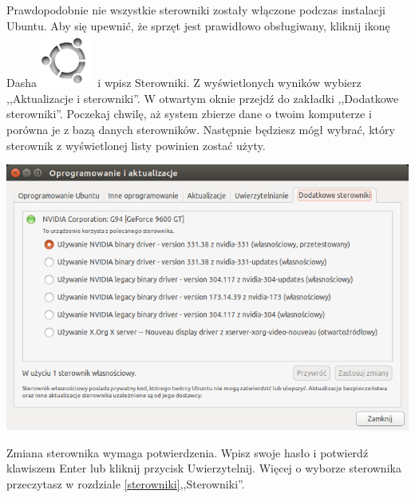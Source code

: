 Prawdopodobnie nie wszystkie sterowniki zostały włączone podczas instalacji Ubuntu. Aby się upewnić, że sprzęt jest prawidłowo obsługiwany, kliknij ikonę Dasha \includegraphics[scale=0.35]{images/ikony_dash.png} i wpisz \textcolor{ubuntu_orange}{Sterowniki}. Z wyświetlonych wyników wybierz ,,Aktualizacje i sterowniki''. W otwartym oknie przejdź do zakładki ,,Dodatkowe sterowniki''. Poczekaj chwilę, aż system zbierze dane o twoim komputerze i porówna je z bazą danych sterowników. Następnie będziesz mógł wybrać, który sterownik z wyświetlonej listy powinien zostać użyty.
\begin{center}
	\includegraphics[width=\linewidth]{images/pierwsze_uruchomienie_driver2.png}
\end{center}

Zmiana sterownika wymaga potwierdzenia. Wpisz swoje hasło i potwierdź klawiszem Enter lub kliknij przycisk \textcolor{ubuntu_orange}{Uwierzytelnij}. Więcej o wyborze sterownika przeczytasz w rozdziale \ref{sterowniki},,Sterowniki''.
\clearpage
